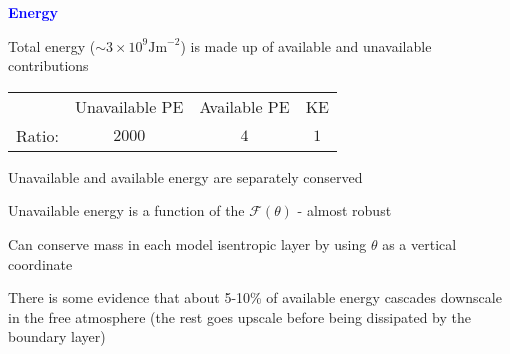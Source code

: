 \documentclass[a4]{seminar}
\newcommand{\B}[1]{\textcolor{blue}{#1}}
\begin{document}
\begin{slide}

\B{\bf Energy}

\vspace{2mm}

Total energy (\( \sim 3 \times 10^9 \mathrm{Jm}^{-2} \)) is made up of
available and unavailable contributions

\begin{center}

\vspace{2mm}

\begin{tabular}{|c|ccc|}
\hline

&
Unavailable PE
&
Available PE
&
KE
\\
Ratio:
&
\( 2000 \)
&
\( 4 \)
&
\( 1 \)
\\
\hline
\end{tabular}

\end{center}

\end{slide}


\begin{slide}

Unavailable and available energy are separately conserved

\vspace{3mm}

Unavailable energy is a function of the \( \mathcal{F}(\theta) \) - almost robust

\vspace{3mm}

Can conserve mass in each model isentropic layer by using \( \theta \) as
a vertical coordinate

\vspace{3mm}

There is some evidence that about 5-10\% of available energy
cascades downscale in the free atmosphere (the rest goes upscale before
being dissipated by the boundary layer)



\end{slide}

\end{document}
